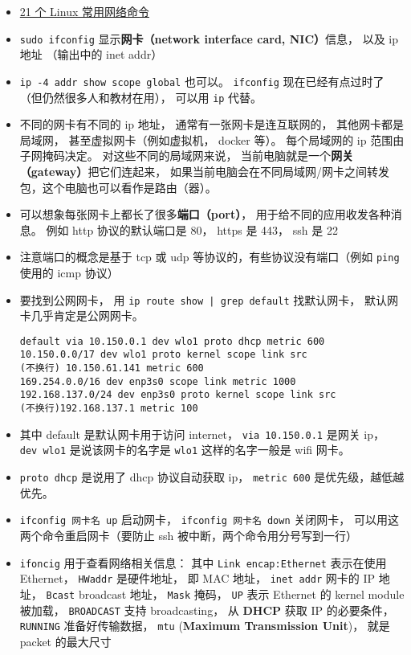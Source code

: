 
\begin{issues}
\issueDraft
\end{issues}

\begin{itemize}
\item \href{https://itsfoss.com/basic-linux-networking-commands/}{21 个 Linux 常用网络命令}
\item \verb`sudo ifconfig` 显示\textbf{网卡（network interface card, NIC）}信息， 以及 ip 地址 （输出中的 inet addr）
\item \verb|ip -4 addr show scope global| 也可以。 \verb|ifconfig| 现在已经有点过时了（但仍然很多人和教材在用）， 可以用 \verb|ip| 代替。
\item 不同的网卡有不同的 ip 地址， 通常有一张网卡是连互联网的， 其他网卡都是局域网， 甚至虚拟网卡（例如虚拟机， docker 等）。 每个局域网的 ip 范围由子网掩码决定。 对这些不同的局域网来说， 当前电脑就是一个\textbf{网关（gateway）}把它们连起来， 如果当前电脑会在不同局域网/网卡之间转发包，这个电脑也可以看作是路由（器）。
\item 可以想象每张网卡上都长了很多\textbf{端口（port）}， 用于给不同的应用收发各种消息。 例如 http 协议的默认端口是 80， https 是 443， ssh 是 22
\item 注意端口的概念是基于 tcp 或 udp 等协议的，有些协议没有端口（例如 \verb`ping` 使用的 icmp 协议）
\item 要找到公网网卡， 用 \verb`ip route show | grep default` 找默认网卡， 默认网卡几乎肯定是公网网卡。
\begin{lstlisting}[language=none]
default via 10.150.0.1 dev wlo1 proto dhcp metric 600
10.150.0.0/17 dev wlo1 proto kernel scope link src
(不换行) 10.150.61.141 metric 600
169.254.0.0/16 dev enp3s0 scope link metric 1000
192.168.137.0/24 dev enp3s0 proto kernel scope link src
(不换行)192.168.137.1 metric 100
\end{lstlisting}
\item 其中 default 是默认网卡用于访问 internet， \verb`via 10.150.0.1` 是网关 ip， \verb`dev wlo1` 是说该网卡的名字是 \verb`wlo1` 这样的名字一般是 wifi 网卡。
\item \verb`proto dhcp` 是说用了 dhcp 协议自动获取 ip， \verb`metric 600` 是优先级，越低越优先。
\item \verb`ifconfig 网卡名 up` 启动网卡， \verb`ifconfig 网卡名 down` 关闭网卡， 可以用这两个命令重启网卡（要防止 ssh 被中断，两个命令用分号写到一行）
\item \verb`ifoncig` 用于查看网络相关信息： 其中 \verb`Link encap:Ethernet` 表示在使用 Ethernet， \verb`HWaddr` 是硬件地址， 即 MAC 地址， \verb`inet addr` 网卡的 IP 地址， \verb`Bcast` broadcast 地址， \verb`Mask` 掩码， \verb`UP` 表示 Ethernet 的 kernel module 被加载， \verb`BROADCAST` 支持 broadcasting， 从 \textbf{DHCP} 获取 IP 的必要条件， \verb`RUNNING` 准备好传输数据， \verb`mtu` (\textbf{Maximum Transmission Unit})， 就是 packet 的最大尺寸

\end{itemize}
